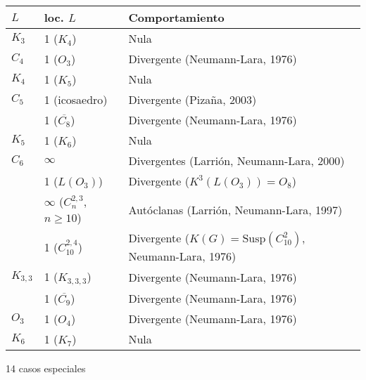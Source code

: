 \documentclass[beamer]{standalone}
\begin{document}
\SetVertexSimple[FillColor=gray, MinSize=0.7pt, InnerSep=0.7pt, LineWidth=0.5pt]


\setlength{\fboxsep}{1pt}

\begin{standaloneframe}
    \begin{center}
    \scriptsize
    \begin{tabular}{|M|M|l|}
      \hline
      $L$ & loc. $L$ & Comportamiento\\
      \hline
      $K_{3}$ & 1 ($K_{4}$) & Nula\\
      $C_{4}$ & 1 ($O_{3}$) & Divergente (Neumann-Lara, 1976)\\
      $K_{4}$ & 1 ($K_{5}$) & Nula\\
      $C_{5}$ & 1 (icosaedro) & Divergente (Pizaña, 2003)\\
       & 1 ($\overline{C_{8}}$) & Divergente (Neumann-Lara, 1976)\\
      $K_{5}$ & 1 ($K_{6}$) & Nula\\
      $C_{6}$ & $\infty$ & Divergentes (Larrión, Neumann-Lara, 2000)\\
       & 1 ($L(O_{3})$) & Divergente ($K^{3}(L(O_{3}))=O_{8}$)\\
       & $\infty$ ($C_{n}^{2,3}$, $n\geq10$) & Autóclanas (Larrión, Neumann-Lara, 1997)\\
       & 1 ($C_{10}^{2,4}$) & Divergente ($K(G)=\mathrm{Susp}(C^{2}_{10})$, Neumann-Lara, 1976)\\
      $K_{3,3}$ & 1 ($K_{3,3,3}$) & Divergente (Neumann-Lara, 1976)\\
       & 1 ($\overline{C_{9}}$) & Divergente (Neumann-Lara, 1976)\\
      $O_{3}$ & 1 ($O_{4}$) & Divergente (Neumann-Lara, 1976)\\
      $K_{6}$ & 1 ($K_{7}$) & Nula\\
      \hline
    \end{tabular}

    \bigskip

    14 casos especiales
  \end{center}
\end{standaloneframe}
\end{document}
